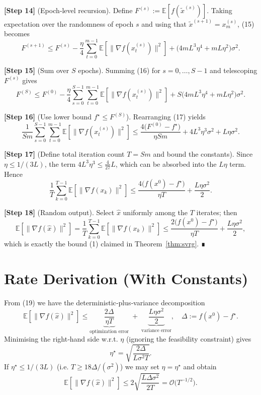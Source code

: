 \documentclass{article}
\newcommand{\E}{\mathbb{E}}
\begin{document}
\noindent\textbf{[Step 14]} (Epoch‑level recursion).  
Define $F^{(s)}:=\E[f(\tilde{x}^{(s)})]$. Taking expectation over the randomness of epoch $s$ and using that $\tilde{x}^{(s+1)}=x_m^{(s)}$, (15) becomes
\[
F^{(s+1)}\le F^{(s)}-\frac{\eta}{4}\sum_{t=0}^{m-1}\E[\|\nabla f(x_t^{(s)})\|^{2}]
   +\big(4mL^{3}\eta^{4}+mL\eta^{2}\big)\sigma^{2}. \tag{16}
\]

\noindent\textbf{[Step 15]} (Sum over $S$ epochs).  
Summing (16) for $s=0,\dots,S-1$ and telescoping $F^{(s)}$ gives
\[
F^{(S)}\le F^{(0)}
   -\frac{\eta}{4}\sum_{s=0}^{S-1}\sum_{t=0}^{m-1}
       \E[\|\nabla f(x_t^{(s)})\|^{2}]
   +S\big(4mL^{3}\eta^{4}+mL\eta^{2}\big)\sigma^{2}. \tag{17}
\]

\noindent\textbf{[Step 16]} (Use lower bound $f^{\star}\le F^{(S)}$).  
Rearranging (17) yields
\[
\frac{1}{Sm}\sum_{s=0}^{S-1}\sum_{t=0}^{m-1}
   \E[\|\nabla f(x_t^{(s)})\|^{2}]
\le\frac{4\big(F^{(0)}-f^{\star}\big)}{\eta Sm}
   +4L^{3}\eta^{3}\sigma^{2}
   +L\eta\sigma^{2}. \tag{18}
\]

\noindent\textbf{[Step 17]} (Define total iteration count $T=Sm$ and bound the constants).  
Since $\eta\le 1/(3L)$, the term $4L^{3}\eta^{3}\le \frac{4}{27}L$, which can be absorbed into the $L\eta$ term. Hence
\[
\frac{1}{T}\sum_{k=0}^{T-1}
   \E[\|\nabla f(x_k)\|^{2}]
\le\frac{4\big(f(x^{0})-f^{\star}\big)}{\eta T}
   +\frac{L\eta\sigma^{2}}{2}. \tag{19}
\]

\noindent\textbf{[Step 18]} (Random output).  
Select $\hat{x}$ uniformly among the $T$ iterates; then
\[
\E[\|\nabla f(\hat{x})\|^{2}]
= \frac{1}{T}\sum_{k=0}^{T-1}\E[\|\nabla f(x_k)\|^{2}]
\le \frac{2\big(f(x^{0})-f^{\star}\big)}{\eta T}
   +\frac{L\eta\sigma^{2}}{2},
\]
which is exactly the bound (1) claimed in Theorem~\ref{thm:svrg}.  ∎

\section*{Rate Derivation (With Constants)}
From (19) we have the deterministic‑plus‑variance decomposition
\[
\E[\|\nabla f(\hat{x})\|^{2}]
\le \underbrace{\frac{2\Delta}{\eta T}}_{\text{optimization error}}
   \;+\;
   \underbrace{\frac{L\eta\sigma^{2}}{2}}_{\text{variance error}},
\quad\Delta:=f(x^{0})-f^{\star}.
\]
Minimising the right‑hand side w.r.t. $\eta$ (ignoring the feasibility constraint) gives
\[
\eta^{\star} = \sqrt{\frac{2\Delta}{L\sigma^{2}T}}.
\]
If $\eta^{\star}\le 1/(3L)$ (i.e. $T\ge 18\Delta/(\sigma^{2})$) we may set $\eta=\eta^{\star}$ and obtain
\[
\E[\|\nabla f(\hat{x})\|^{2}]
\le 2\sqrt{\frac{L\Delta\sigma^{2}}{2T}}
   =\mathcal{O}\!\big(T^{-1/2}\big).
\]
\end{document}
